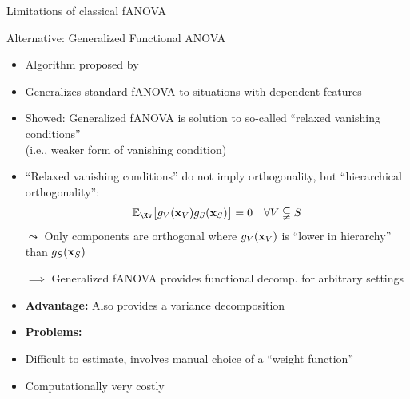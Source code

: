 \documentclass[10pt,compress,t,notes=noshow, xcolor=table]{beamer}
\begin{document}
\begin{frame}{Limitations of classical fANOVA}

    
    
\end{frame}

\begin{frame}{Alternative: Generalized Functional ANOVA}

\begin{itemize}
    \item Algorithm proposed by 
    \item Generalizes standard fANOVA to situations with dependent features
    \pause
    \item Showed: Generalized fANOVA is solution to so-called ``relaxed vanishing conditions'' \\
    (i.e., weaker form of vanishing condition) \\
    \item ``Relaxed vanishing conditions'' do not imply orthogonality, but ``hierarchical orthogonality'':
    $$
    \mathbb{E}_{\Xv} \bigl[ g_{V}(\xv_V) g_{S}(\xv_S) \bigr] = 0 \quad \forall V \subsetneqq S
    $$
    \pause
    $\leadsto$ Only components are orthogonal where $g_{V}(\mathbf{x}_V)$ is ``lower in hierarchy'' than $g_{S}(\mathbf{x}_S)$
    \item[$\implies$] Generalized fANOVA provides functional decomp. for arbitrary settings
    \item \textbf{Advantage:} Also provides a variance decomposition
    \pause
    \item \textbf{Problems:}
    \item Difficult to estimate, involves manual choice of a ``weight function''
    \item Computationally very costly
    
\end{itemize}



    
\end{frame}
\end{document}
